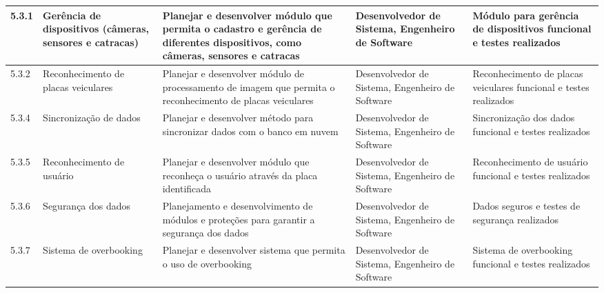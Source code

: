 \begin{landscape}
\begin{longtable}{@{\extracolsep{\fill}}  l  p{}  p{}  p{}  p{}  }
	\midrule
	5.3.1       & Gerência de dispositivos (câmeras, sensores e catracas) & Planejar e desenvolver módulo que permita o cadastro e gerência de diferentes dispositivos, como câmeras, sensores e catracas                                                 & Desenvolvedor de Sistema, Engenheiro de Software                                                 & Módulo para gerência de dispositivos funcional e testes realizados                                     \\*
	\midrule
	5.3.2       & Reconhecimento de placas veiculares                       & Planejar e desenvolver módulo de processamento de imagem que permita o reconhecimento de placas veiculares                                                                      & Desenvolvedor de Sistema, Engenheiro de Software                                                 & Reconhecimento de placas veiculares funcional e testes realizados                                        \\*
	\midrule
	5.3.4       & Sincronização de dados                                  & Planejar e desenvolver método para sincronizar dados com o banco em nuvem                                                                                                       & Desenvolvedor de Sistema, Engenheiro de Software                                                 & Sincronização dos dados funcional e testes realizados                                                  \\*
	\midrule
	5.3.5       & Reconhecimento de usuário                                & Planejar e desenvolver módulo que reconheça o usuário através da placa identificada                                                                                          & Desenvolvedor de Sistema, Engenheiro de Software                                                 & Reconhecimento de usuário funcional e testes realizados                                                 \\*
	\midrule
	5.3.6       & Segurança dos dados                                      & Planejamento e desenvolvimento de módulos e proteções para garantir a segurança dos dados                                                                                    & Desenvolvedor de Sistema, Engenheiro de Software                                                 & Dados seguros e testes de segurança realizados                                                          \\*
	\midrule
	5.3.7       & Sistema de overbooking                                    & Planejar e desenvolver sistema que permita o uso de overbooking                                                                                                                  & Desenvolvedor de Sistema, Engenheiro de Software                                                 & Sistema de overbooking funcional e testes realizados                                                     \\*

\end{longtable}
\end{landscape}
